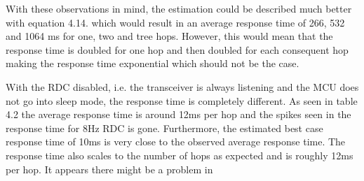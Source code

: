 With these observations in mind,
	the estimation could be described much better with equation 4.14.
which would result in an average response time of 266, 532 and 1064 ms for one,
	two and tree hops.
However,
	this would mean that the response time is doubled for one hop and then doubled for each consequent hop making the response time exponential which should not be the case.

With the RDC disabled,
	i.e.
the transceiver is always listening and the MCU does not go into sleep mode,
	the response time is completely different.
As seen in table 4.2 the average response time is around 12ms per hop and the spikes seen in the response time for 8Hz RDC is gone.
Furthermore,
	the estimated best case response time of 10ms is very close to the observed average response time.
The response time also scales to the number of hops as expected and is roughly 12ms per hop.
It appears there might be a problem in 


